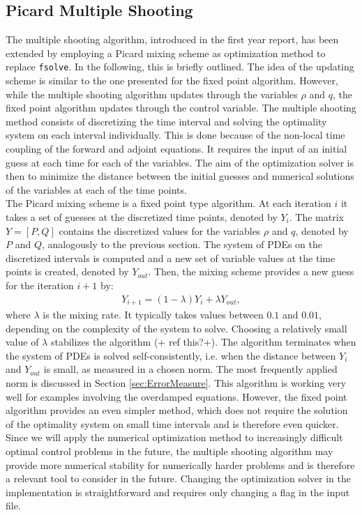\documentclass[11pt, a4paper]{article}
\theoremstyle{definition}
\begin{document}
\subsection{Picard Multiple Shooting}

The multiple shooting algorithm, introduced in the first year report, has been extended by employing a Picard mixing scheme as optimization method to replace \texttt{fsolve}. In the following, this is briefly outlined.
The idea of the updating scheme is similar to the one presented for the fixed point algorithm. However, while the multiple shooting algorithm updates through the variables $\rho$ and $q$, the fixed point algorithm updates through the control variable.
The multiple shooting method consists of discretizing the time interval and solving the optimality system on each interval individually. This is done because of the non-local time coupling of the forward and adjoint equations. It requires the input of an initial guess at each time for each of the variables. The aim of the optimization solver is then to minimize the distance between the initial guesses and numerical solutions of the variables at each of the time points. \\
The Picard mixing scheme is a fixed point type algorithm. At each iteration $i$ it takes a set of guesses at the discretized time points, denoted by $Y_i$. The matrix $Y = [P,Q]$ contains the discretized values for the variables $\rho$ and $q$, denoted by $P$ and $Q$, analogously to the previous section.  
The system of PDEs on the discretized intervals is computed and a new set of variable values at the time points is created, denoted by $Y_{out}$. Then, the mixing scheme provides a new guess for the iteration $i+1$ by:
\begin{align*}
Y_{i+1} = (1 - \lambda)Y_i + \lambda Y_{out},
\end{align*}
where $\lambda$ is the mixing rate. It typically takes values between $0.1$ and $0.01$, depending on the complexity of the system to solve. Choosing a relatively small value of $\lambda$ stabilizes the algorithm (+ ref this?+). 
The algorithm terminates when the system of PDEs is solved self-consistently, i.e. when the distance between $Y_i$ and $Y_{out}$ is small, as measured in a chosen norm. The most frequently applied norm is discussed in Section \ref{sec:ErrorMeasure}.
This algorithm is working very well for examples involving the overdamped equations. However, the fixed point algorithm provides an even simpler method, which does not require the solution of the optimality system on small time intervals and is therefore even quicker. Since we will apply the numerical optimization method to increasingly difficult optimal control problems in the future, the multiple shooting algorithm may provide more numerical stability for numerically harder problems and is therefore a relevant tool to consider in the future. Changing the optimization solver in the implementation is straightforward and requires only changing a flag in the input file.
\end{document}

